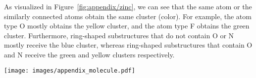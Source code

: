 \documentclass{article} \usepackage{iclr2021_conference,times}
\begin{document}
As visualized in Figure~\ref{fig:appendix/zinc}, we can see that the same atom or the similarly connected atoms obtain the same cluster (color). For example, the atom type O mostly obtains the yellow cluster, and the atom type F obtains the green cluster. Furthermore, ring-shaped substructures that do not contain O or N mostly receive the blue cluster, whereas ring-shaped substructures that contain O and N receive the green and yellow clusters respectively.

\begin{figure*}[h]
    \centering
    \texttt{[image: images/appendix\_molecule.pdf]}
    \vskip -0.175in
    \caption{\textbf{Molecule Reconstruction Examples (Left):} Original molecules with the assigned cluster on each node represented as color, where cluster is generated from \emph{Graph Multiset Pooling} (GMPool). \textbf{(Right):} Reconstructed molecules. Red dotted circle indicates the incorrect atom prediction.}
    \label{fig:appendix/zinc}
\end{figure*} 
\end{document}
